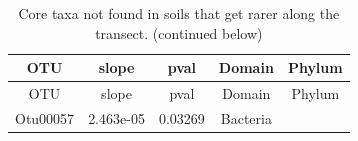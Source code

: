 \documentclass[]{article}
\begin{document}
\begin{longtable}[]{@{}ccccc@{}}
\caption{Core taxa not found in soils that get rarer along the transect.
(continued below)}\tabularnewline
\toprule
\begin{minipage}[b]{0.13\columnwidth}\centering\strut
OTU\strut
\end{minipage} & \begin{minipage}[b]{0.14\columnwidth}\centering\strut
slope\strut
\end{minipage} & \begin{minipage}[b]{0.12\columnwidth}\centering\strut
pval\strut
\end{minipage} & \begin{minipage}[b]{0.13\columnwidth}\centering\strut
Domain\strut
\end{minipage} & \begin{minipage}[b]{0.19\columnwidth}\centering\strut
Phylum\strut
\end{minipage}\tabularnewline
\midrule
\endfirsthead
\toprule
\begin{minipage}[b]{0.13\columnwidth}\centering\strut
OTU\strut
\end{minipage} & \begin{minipage}[b]{0.14\columnwidth}\centering\strut
slope\strut
\end{minipage} & \begin{minipage}[b]{0.12\columnwidth}\centering\strut
pval\strut
\end{minipage} & \begin{minipage}[b]{0.13\columnwidth}\centering\strut
Domain\strut
\end{minipage} & \begin{minipage}[b]{0.19\columnwidth}\centering\strut
Phylum\strut
\end{minipage}\tabularnewline
\midrule
\endhead
\begin{minipage}[t]{0.13\columnwidth}\centering\strut
Otu00057\strut
\end{minipage} & \begin{minipage}[t]{0.14\columnwidth}\centering\strut
2.463e-05\strut
\end{minipage} & \begin{minipage}[t]{0.12\columnwidth}\centering\strut
0.03269\strut
\end{minipage} & \begin{minipage}[t]{0.13\columnwidth}\centering\strut
Bacteria\strut
\end{minipage} & \begin{minipage}[t]{0.19\columnwidth}\centering\strut

\end{minipage}
\end{longtable}
\end{document}
